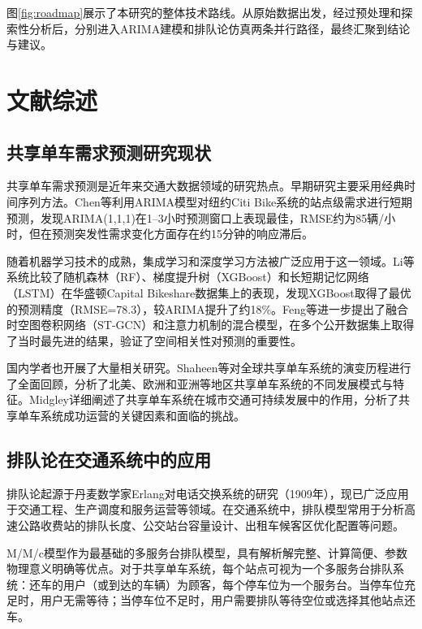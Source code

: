 \documentclass[12pt,a4paper]{article}
\begin{document}
图\ref{fig:roadmap}展示了本研究的整体技术路线。从原始数据出发，经过预处理和探索性分析后，分别进入ARIMA建模和排队论仿真两条并行路径，最终汇聚到结论与建议。

\section{文献综述}

\subsection{共享单车需求预测研究现状}

共享单车需求预测是近年来交通大数据领域的研究热点。早期研究主要采用经典时间序列方法。Chen等\cite{chen2020}利用ARIMA模型对纽约Citi Bike系统的站点级需求进行短期预测，发现ARIMA(1,1,1)在1--3小时预测窗口上表现最佳，RMSE约为85辆/小时，但在预测突发性需求变化方面存在约15分钟的响应滞后。

随着机器学习技术的成熟，集成学习和深度学习方法被广泛应用于这一领域。Li等\cite{li2021}系统比较了随机森林（RF）、梯度提升树（XGBoost）和长短期记忆网络（LSTM）在华盛顿Capital Bikeshare数据集上的表现，发现XGBoost取得了最优的预测精度（RMSE=78.3），较ARIMA提升了约18\%。Feng等\cite{feng2022}进一步提出了融合时空图卷积网络（ST-GCN）和注意力机制的混合模型，在多个公开数据集上取得了当时最先进的结果，验证了空间相关性对预测的重要性。

国内学者也开展了大量相关研究。Shaheen等\cite{shaheen2010}对全球共享单车系统的演变历程进行了全面回顾，分析了北美、欧洲和亚洲等地区共享单车系统的不同发展模式与特征。Midgley\cite{midgley2011}详细阐述了共享单车系统在城市交通可持续发展中的作用，分析了共享单车系统成功运营的关键因素和面临的挑战。

\subsection{排队论在交通系统中的应用}

排队论起源于丹麦数学家Erlang对电话交换系统的研究（1909年），现已广泛应用于交通工程、生产调度和服务运营等领域\cite{gross2008}。在交通系统中，排队模型常用于分析高速公路收费站的排队长度、公交站台容量设计、出租车候客区优化配置等问题。

M/M/c模型作为最基础的多服务台排队模型，具有解析解完整、计算简便、参数物理意义明确等优点\cite{kleinrock1975}。对于共享单车系统，每个站点可视为一个多服务台排队系统：还车的用户（或到达的车辆）为顾客，每个停车位为一个服务台。当停车位充足时，用户无需等待；当停车位不足时，用户需要排队等待空位或选择其他站点还车。
\end{document}

